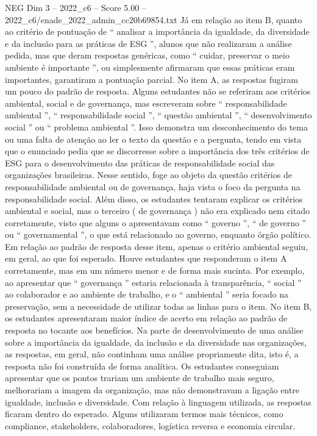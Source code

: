 \begin{textsample}{NEG Dim 3 – 2022\_c6 – Score 5.00 – 2022\_c6/enade\_2022\_admin\_cc20b69854.txt}
Já em relação ao item B, quanto ao critério de pontuação de “ analisar a importância da igualdade, da diversidade e da inclusão para as práticas de ESG ”, alunos que não realizaram a análise pedida, mas que deram respostas genéricas, como “ cuidar, preservar o meio ambiente é importante ”, ou simplesmente afirmaram que essas práticas eram importantes, garantiram a pontuação parcial.
No item A, as respostas fugiram um pouco do padrão de resposta.
Alguns estudantes não se referiram aos critérios ambiental, social e de governança, mas escreveram sobre “ responsabilidade ambiental ”, “ responsabilidade social ”, “ questão ambiental ”, “ desenvolvimento social ” ou “ problema ambiental ”.
Isso demonstra um desconhecimento do tema ou uma falta de atenção ao ler o texto da questão e a pergunta, tendo em vista que o enunciado pedia que se discorresse sobre a importância dos três critérios de ESG para o desenvolvimento das práticas de responsabilidade social das organizações brasileiras.
Nesse sentido, foge ao objeto da questão critérios de responsabilidade ambiental ou de governança, haja vista o foco da pergunta na responsabilidade social.
Além disso, os estudantes tentaram explicar os critérios ambiental e social, mas o terceiro ( de governança ) não era explicado nem citado corretamente, visto que alguns o apresentavam como “ governo ”, “ de governo ” ou “ governamental ”, o que está relacionado ao governo, enquanto órgão político.
Em relação ao padrão de resposta desse item, apenas o critério ambiental seguiu, em geral, ao que foi esperado.
Houve estudantes que responderam o item A corretamente, mas em um número menor e de forma mais sucinta.
Por exemplo, ao apresentar que “ governança ” estaria relacionada à transparência, “ social ” ao colaborador e ao ambiente de trabalho, e o “ ambiental ” seria focado na preservação, sem a necessidade de utilizar todas as linhas para o item.
No item B, os estudantes apresentaram maior índice de acerto em relação ao padrão de resposta no tocante aos benefícios.
Na parte de desenvolvimento de uma análise sobre a importância da igualdade, da inclusão e da diversidade nas organizações, as respostas, em geral, não continham uma análise propriamente dita, isto é, a resposta não foi construída de forma analítica.
Os estudantes conseguiam apresentar que os pontos trariam um ambiente de trabalho mais seguro, melhorariam a imagem da organização, mas não demonstravam a ligação entre igualdade, inclusão e diversidade.
Com relação à linguagem utilizada, as respostas ficaram dentro do esperado.
Alguns utilizaram termos mais técnicos, como compliance, stakeholders, colaboradores, logística reversa e economia circular.

\end{textsample}
